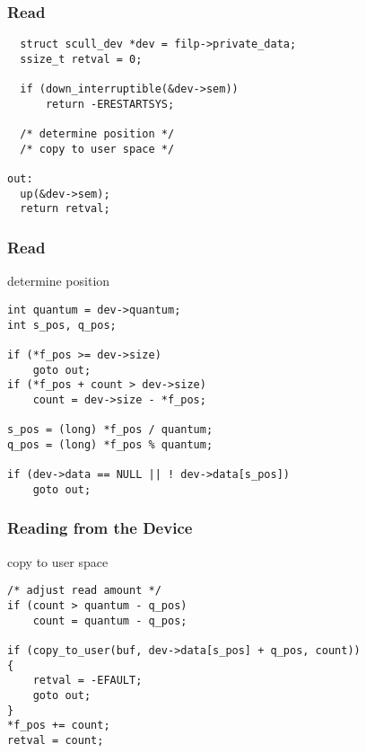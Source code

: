 \documentclass[dvipsnames]{beamer}
\begin{document}
\begin{frame}[fragile]
  \frametitle{Read}

  \begin{exampleblock}{}
    \begin{lstlisting}
  struct scull_dev *dev = filp->private_data;
  ssize_t retval = 0;

  if (down_interruptible(&dev->sem))
      return -ERESTARTSYS;

  /* determine position */
  /* copy to user space */

out:
  up(&dev->sem);
  return retval;
    \end{lstlisting}
  \end{exampleblock}
\end{frame}

\begin{frame}[fragile]
  \frametitle{Read}

  \begin{exampleblock}{determine position}
    \begin{lstlisting}
int quantum = dev->quantum;
int s_pos, q_pos;

if (*f_pos >= dev->size)
    goto out;
if (*f_pos + count > dev->size)
    count = dev->size - *f_pos;

s_pos = (long) *f_pos / quantum;
q_pos = (long) *f_pos % quantum;

if (dev->data == NULL || ! dev->data[s_pos])
    goto out;
    \end{lstlisting}
  \end{exampleblock}
\end{frame}

\begin{frame}[fragile]
  \frametitle{Reading from the Device}

  \begin{exampleblock}{copy to user space}
    \begin{lstlisting}
/* adjust read amount */
if (count > quantum - q_pos)
    count = quantum - q_pos;

if (copy_to_user(buf, dev->data[s_pos] + q_pos, count))
{
    retval = -EFAULT;
    goto out;
}
*f_pos += count;
retval = count;
    \end{lstlisting}
  \end{exampleblock}
\end{frame}
\end{document}
